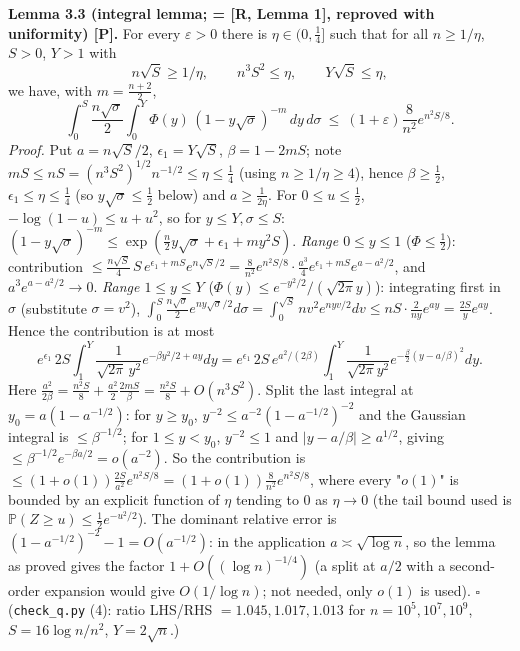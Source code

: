 \textbf{Lemma 3.3 (integral lemma; = {[}R, Lemma 1{]}, reproved with uniformity) {[}P{]}.} For every \(\varepsilon>0\) there is \(\eta\in(0,\frac14]\) such that for all \(n\ge1/\eta\), \(S>0\), \(Y>1\) with
\[n\sqrt S\ge1/\eta,\qquad n^3S^2\le\eta,\qquad Y\sqrt S\le\eta,\]
we have, with \(m=\frac{n+2}2\),
\[\int_0^S\frac{n\sqrt\sigma}2\int_0^Y\Phi(y)\,(1-y\sqrt\sigma)^{-m}\,dy\,d\sigma\ \le\ (1+\varepsilon)\frac8{n^2}e^{n^2S/8}.\]
\emph{Proof.} Put \(a=n\sqrt S/2\), \(\epsilon_1=Y\sqrt S\), \(\beta=1-2mS\); note \(mS\le nS=(n^3S^2)^{1/2}n^{-1/2}\le\eta\le\frac14\) (using \(n\ge1/\eta\ge4\)), hence \(\beta\ge\frac12\), \(\epsilon_1\le\eta\le\frac14\) (so \(y\sqrt\sigma\le\frac12\) below) and \(a\ge\frac1{2\eta}\). For \(0\le u\le\frac12\), \(-\log(1-u)\le u+u^2\), so for
\(y\le Y,\sigma\le S\): \((1-y\sqrt\sigma)^{-m}\le\exp(\tfrac n2y\sqrt\sigma+\epsilon_1+my^2S)\).
\emph{Range \(0\le y\le1\)} (\(\Phi\le\frac12\)): contribution \(\le\frac{n\sqrt S}4\,S\,e^{\epsilon_1+mS}e^{n\sqrt S/2}=\frac8{n^2}e^{n^2S/8}\cdot\frac{a^3}{4}e^{\epsilon_1+mS}e^{a-a^2/2}\), and \(a^3e^{a-a^2/2}\to0\).
\emph{Range \(1\le y\le Y\)} (\(\Phi(y)\le e^{-y^2/2}/(\sqrt{2\pi}y)\)): integrating first in \(\sigma\) (substitute \(\sigma=v^2\)),
\(\int_0^S\frac{n\sqrt\sigma}2e^{ny\sqrt\sigma/2}d\sigma=\int_0^{\sqrt S}nv^2e^{nyv/2}dv\le nS\cdot\frac2{ny}e^{ay}=\frac{2S}ye^{ay}\). Hence the contribution is at most
\[e^{\epsilon_1}\,2S\int_1^Y\frac{1}{\sqrt{2\pi}\,y^2}e^{-\beta y^2/2+ay}dy=e^{\epsilon_1}\,2S\,e^{a^2/(2\beta)}\int_1^Y\frac{1}{\sqrt{2\pi}y^2}e^{-\frac\beta2(y-a/\beta)^2}dy .\]
Here \(\frac{a^2}{2\beta}=\frac{n^2S}8+\frac{a^2}{2}\frac{2mS}{\beta}=\frac{n^2S}8+O(n^3S^2)\). Split the last integral at \(y_0=a(1-a^{-1/2})\): for \(y\ge y_0\), \(y^{-2}\le a^{-2}(1-a^{-1/2})^{-2}\) and
the Gaussian integral is \(\le\beta^{-1/2}\); for \(1\le y<y_0\), \(y^{-2}\le1\) and \(|y-a/\beta|\ge a^{1/2}\), giving \(\le\beta^{-1/2}e^{-\beta a/2}=o(a^{-2})\).
So the contribution is \(\le(1+o(1))\frac{2S}{a^2}e^{n^2S/8}=(1+o(1))\frac8{n^2}e^{n^2S/8}\), where every "\(o(1)\)" is bounded by an explicit function of \(\eta\) tending to \(0\) as \(\eta\to0\) (the tail bound used is \(\mathbb P(Z\ge u)\le\frac12e^{-u^2/2}\)). The dominant relative error is \((1-a^{-1/2})^{-2}-1=O(a^{-1/2})\): in the application \(a\asymp\sqrt{\log n}\), so the lemma as proved gives the factor \(1+O((\log n)^{-1/4})\) (a split at \(a/2\) with a second-order expansion would give \(O(1/\log n)\); not needed, only \(o(1)\) is used). \(\square\)
(\texttt{check\_q.py} (4): ratio LHS/RHS \(=1.045,1.017,1.013\) for \(n=10^5,10^7,10^9\), \(S=16\log n/n^2\), \(Y=2\sqrt n\).)

